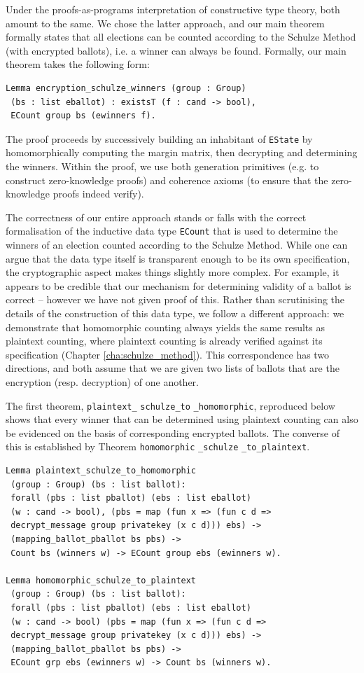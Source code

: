 \noindent
Under the proofs-as-programs interpretation of constructive type
theory, both amount to the same. We chose the latter approach, and
our main theorem formally states that all elections can be
counted according to the Schulze Method (with encrypted ballots),
i.e. a winner can always be found. Formally, our main theorem takes
the following form:
\begin{verbatim}
Lemma encryption_schulze_winners (group : Group) 
 (bs : list eballot) : existsT (f : cand -> bool), 
 ECount group bs (ewinners f).
\end{verbatim}

\noindent
The proof proceeds by successively building an inhabitant of
\texttt{EState} by homomorphically computing the margin matrix, then
decrypting and determining the winners. Within the proof, we use
both generation primitives (e.g. to construct zero-knowledge proofs)
and coherence axioms (to ensure that the zero-knowledge proofs
indeed verify). 

The correctness of our entire approach stands or falls with the
correct formalisation of the inductive data type \texttt{ECount}
that is used to determine the winners of an election counted
according to the Schulze Method. While one can argue that the data
type itself is transparent enough to be its own specification,
the cryptographic aspect makes things slightly more complex. For
example, it appears to be credible that our mechanism for
determining validity of a ballot is correct -- however we have not
given proof of this. Rather than scrutinising the details of the
construction of this data type, we follow a different approach: we
demonstrate that homomorphic counting always yields the same results
as plaintext counting, where plaintext counting is already verified
against its specification (Chapter \ref{cha:schulze_method}). 
This correspondence has two directions, and both assume that we are given
two lists of ballots that are the encryption (resp. decryption) of
one another. 


The first theorem, \texttt{plaintext\_} \texttt{schulze\_to} \texttt{\_homomorphic}, 
reproduced below shows
that every winner that can be determined using plaintext counting
can also be evidenced on the basis of corresponding encrypted ballots. The
converse of this is established by 
Theorem \texttt{homomorphic} \texttt{\_schulze} \texttt{\_to\_plaintext}.

\begin{verbatim}
Lemma plaintext_schulze_to_homomorphic 
 (group : Group) (bs : list ballot): 
 forall (pbs : list pballot) (ebs : list eballot) 
 (w : cand -> bool), (pbs = map (fun x => (fun c d => 
 decrypt_message group privatekey (x c d))) ebs) ->
 (mapping_ballot_pballot bs pbs) -> 
 Count bs (winners w) -> ECount group ebs (ewinners w).
      
Lemma homomorphic_schulze_to_plaintext 
 (group : Group) (bs : list ballot):
 forall (pbs : list pballot) (ebs : list eballot) 
 (w : cand -> bool) (pbs = map (fun x => (fun c d => 
 decrypt_message group privatekey (x c d))) ebs) ->
 (mapping_ballot_pballot bs pbs) ->
 ECount grp ebs (ewinners w) -> Count bs (winners w).
\end{verbatim}

